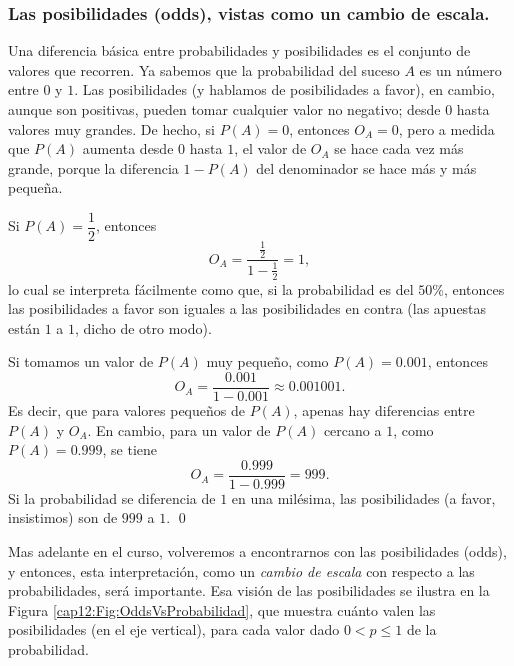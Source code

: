 \subsubsection*{Las posibilidades (odds), vistas como un cambio de escala.}

Una diferencia básica entre probabilidades y posibilidades es el conjunto de valores que recorren.  Ya sabemos que la probabilidad del suceso $A$ es un número entre $0$ y $1$. Las posibilidades (y hablamos de posibilidades a favor), en cambio, aunque son positivas, pueden tomar cualquier valor no negativo; desde $0$ hasta valores muy grandes. De hecho, si $P(A)=0$, entonces $O_A=0$, pero a medida que $P(A)$ aumenta desde $0$ hasta $1$, el valor de $O_A$ se hace cada vez más grande, porque la diferencia $1-P(A)$ del denominador se hace más y más pequeña.

\begin{ejemplo}
\label{cap03:ejem:OddsVsProbabilidades05}
Si $P(A)=\dfrac{1}{2}$, entonces
\[O_A=\dfrac{\frac{1}{2}}{1-\frac{1}{2}}=1,\]
lo cual se interpreta fácilmente como que, si la probabilidad es del $50\%$, entonces las posibilidades a favor son iguales a las posibilidades en contra (las apuestas están $1$ a $1$, dicho de otro modo).

Si tomamos un valor de $P(A)$ muy pequeño, como $P(A)=0.001$, entonces
\[O_A=\dfrac{0.001}{1-0.001}\approx 0.001001.\]
Es decir, que para valores pequeños de $P(A)$, apenas hay diferencias entre $P(A)$ y $O_A$. En cambio, para un valor de $P(A)$ cercano a $1$, como $P(A)=0.999$, se tiene
\[O_A=\dfrac{0.999}{1-0.999}=999.\]
Si la probabilidad se diferencia de $1$ en una milésima, las posibilidades (a favor, insistimos) son de $999$ a $1$.
\qed
\end{ejemplo}

Mas adelante en el curso, volveremos a encontrarnos con las posibilidades (odds), y entonces, esta interpretación, como un {\em cambio de escala} con respecto a las probabilidades, será importante.  Esa visión de las posibilidades se ilustra en la Figura \ref{cap12:Fig:OddsVsProbabilidad}, que muestra cuánto valen las posibilidades (en el eje vertical), para cada valor dado $0<p\leq1$ de la probabilidad.

